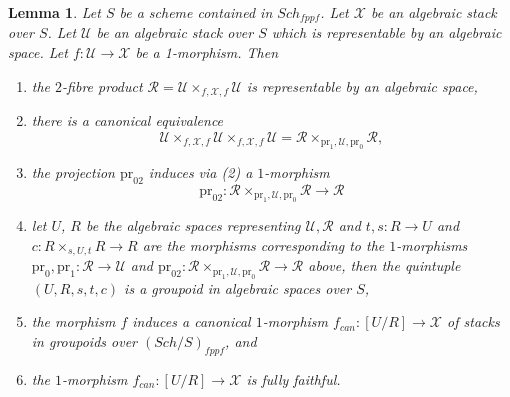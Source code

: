 \documentclass{stacks-project}
\theoremstyle{plain}
\newtheorem{lemma}[subsection]{Lemma}
\theoremstyle{definition}
\theoremstyle{remark}
\numberwithin{equation}{subsection}
\def\Sch{\mathit{Sch}}
\begin{document}
\begin{lemma}
\label{lemma-map-space-into-stack}
Let $S$ be a scheme contained in $\Sch_{fppf}$.
Let $\mathcal{X}$ be an algebraic stack over $S$.
Let $\mathcal{U}$ be an algebraic stack over $S$ which
is representable by an algebraic space.
Let $f : \mathcal{U} \to \mathcal{X}$ be a 1-morphism. Then
\begin{enumerate}
\item the $2$-fibre product
$\mathcal{R} = \mathcal{U} \times_{f, \mathcal{X}, f} \mathcal{U}$
is representable by an algebraic space,
\item there is a canonical equivalence
$$
\mathcal{U} \times_{f, \mathcal{X}, f} \mathcal{U}
\times_{f, \mathcal{X}, f} \mathcal{U} =
\mathcal{R} \times_{\text{pr}_1, \mathcal{U}, \text{pr}_0} \mathcal{R},
$$
\item the projection $\text{pr}_{02}$ induces via (2) a $1$-morphism
$$
\text{pr}_{02} :
\mathcal{R} \times_{\text{pr}_1, \mathcal{U}, \text{pr}_0} \mathcal{R}
\longrightarrow
\mathcal{R}
$$
\item let $U$, $R$ be the algebraic spaces representing
$\mathcal{U}, \mathcal{R}$ and $t, s : R \to U$ and
$c : R \times_{s, U, t} R \to R$ are the morphisms corresponding
to the $1$-morphisms
$\text{pr}_0, \text{pr}_1 : \mathcal{R} \to \mathcal{U}$
and
$\text{pr}_{02} :
\mathcal{R} \times_{\text{pr}_1, \mathcal{U}, \text{pr}_0} \mathcal{R} \to
\mathcal{R}$ above, then the quintuple $(U, R, s, t, c)$ is a groupoid in
algebraic spaces over $S$,
\item the morphism $f$ induces a canonical $1$-morphism
$f_{can} : [U/R] \to \mathcal{X}$
of stacks in groupoids over $(\Sch/S)_{fppf}$, and
\item the $1$-morphism $f_{can} : [U/R] \to \mathcal{X}$ is fully faithful.
\end{enumerate}
\end{lemma}
\end{document}
